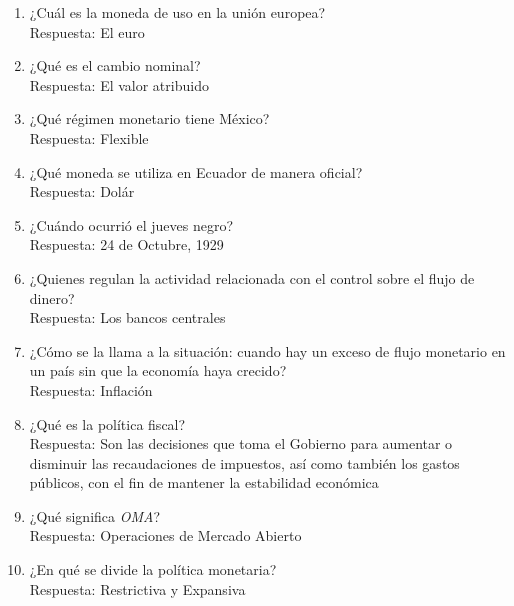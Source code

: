 \documentclass[a4paper,12pt]{report}
\begin{document}
\begin{enumerate}
	\item ¿Cuál es la moneda de uso en la unión europea? \\ Respuesta: El euro
	\item ¿Qué es el cambio nominal? \\ Respuesta: El valor atribuido
	\item ¿Qué régimen monetario tiene México? \\ Respuesta: Flexible
	\item ¿Qué moneda se utiliza en Ecuador de manera oficial? \\ Respuesta: Dolár
	\item ¿Cuándo ocurrió el jueves negro? \\ Respuesta: 24 de Octubre, 1929
	\item ¿Quienes regulan la actividad relacionada con el control sobre el flujo de dinero? \\ Respuesta: Los bancos centrales
	\item ¿Cómo se la llama a la situación: cuando hay un exceso de flujo monetario en un país sin que la economía haya crecido? \\ Respuesta: Inflación
	\item ¿Qué es la política fiscal? \\ Respuesta: Son las decisiones que toma el Gobierno
para aumentar o disminuir las recaudaciones de impuestos, así como también los gastos públicos,
con el fin de mantener la estabilidad económica
	\item ¿Qué significa \emph{OMA}? \\ Respuesta: Operaciones de Mercado Abierto
	\item ¿En qué se divide la política monetaria? \\ Respuesta: Restrictiva y Expansiva
\end{enumerate}
\end{document}
